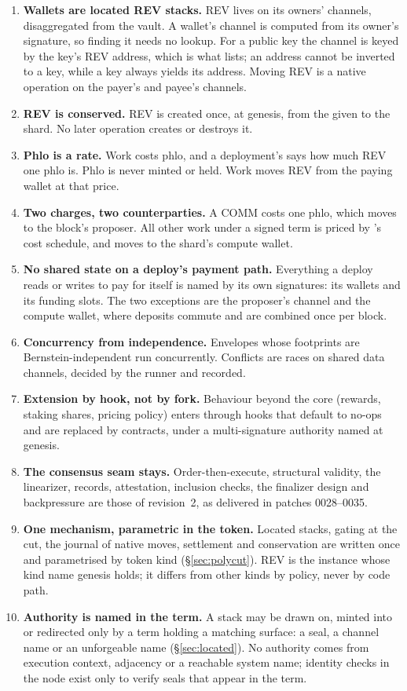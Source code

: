 \documentclass[11pt]{article}
\newcommand{\code}{\path}
\begin{document}
\begin{enumerate}[label=P\arabic*.,leftmargin=2.2em]
\item \textbf{Wallets are located REV stacks.} REV lives on its owners' channels, disaggregated from the vault. A wallet's channel is computed from its owner's signature, so finding it needs no lookup. For a public key the channel is keyed by the key's REV address, which is what \code{wallets.txt} lists; an address cannot be inverted to a key, while a key always yields its address. Moving REV is a native operation on the payer's and payee's channels.
\item \textbf{REV is conserved.} REV is created once, at genesis, from the \code{wallets.txt} given to the shard. No later operation creates or destroys it.
\item \textbf{Phlo is a rate.} Work costs phlo, and a deployment's \code{phloPrice} says how much REV one phlo is. Phlo is never minted or held. Work moves REV from the paying wallet at that price.
\item \textbf{Two charges, two counterparties.} A COMM costs one phlo, which moves to the block's proposer. All other work under a signed term is priced by \code{dev}'s cost schedule, and moves to the shard's compute wallet.
\item \textbf{No shared state on a deploy's payment path.} Everything a deploy reads or writes to pay for itself is named by its own signatures: its wallets and its funding slots. The two exceptions are the proposer's channel and the compute wallet, where deposits commute and are combined once per block.
\item \textbf{Concurrency from independence.} Envelopes whose footprints are Bernstein-independent run concurrently. Conflicts are races on shared data channels, decided by the runner and recorded.
\item \textbf{Extension by hook, not by fork.} Behaviour beyond the core (rewards, staking shares, pricing policy) enters through hooks that default to no-ops and are replaced by contracts, under a multi-signature authority named at genesis.
\item \textbf{The consensus seam stays.} Order-then-execute, structural validity, the linearizer, records, attestation, inclusion checks, the finalizer design and backpressure are those of revision~2, as delivered in patches 0028--0035.
\item \textbf{One mechanism, parametric in the token.} Located stacks, gating at the cut, the journal of native moves, settlement and conservation are written once and parametrised by token kind (\S\ref{sec:polycut}). REV is the instance whose kind name genesis holds; it differs from other kinds by policy, never by code path.
\item \textbf{Authority is named in the term.} A stack may be drawn on, minted into or redirected only by a term holding a matching surface: a seal, a channel name or an unforgeable name (\S\ref{sec:located}). No authority comes from execution context, adjacency or a reachable system name; identity checks in the node exist only to verify seals that appear in the term.
\end{enumerate}
\end{document}
